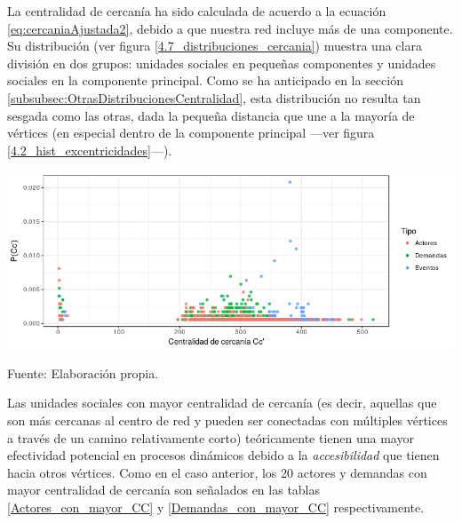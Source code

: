 \documentclass[letterpaper, 11pt]{book}
\theoremstyle{definition}
\theoremstyle{remark}
\begin{document}
La centralidad de cercanía ha sido calculada de acuerdo a la ecuación \ref{eq:cercaniaAjustada2}, debido a que nuestra red incluye más de una componente. 
Su distribución (ver figura \ref{4.7_distribuciones_cercania}) muestra una clara división en dos grupos: unidades sociales en pequeñas componentes y unidades sociales en la componente principal. 
Como se ha anticipado en la sección \ref{subsubsec:OtrasDistribucionesCentralidad}, esta distribución no resulta tan sesgada como las otras, dada la pequeña distancia que une a la mayoría de vértices (en especial dentro de la componente principal ---ver figura \ref{4.2_hist_excentricidades}---). 


\begin{minipage}{\linewidth}
\centering
{} \label{4.7_distribuciones_cercania}
\includegraphics[scale=0.7]{img/4.7_distribuciones_cercania.png}
\par
\small Fuente: Elaboración propia.
\end{minipage}\bigskip


Las unidades sociales con mayor centralidad de cercanía (es decir, aquellas que son más cercanas al centro de red y pueden ser conectadas con múltiples vértices a través de un camino relativamente corto) teóricamente tienen una mayor efectividad potencial en procesos dinámicos debido a la \emph{accesibilidad} que tienen hacia otros vértices. 
Como  en el caso anterior, los 20 actores y demandas con mayor centralidad de cercanía son señalados en las tablas \ref{Actores_con_mayor_CC} y \ref{Demandas_con_mayor_CC} respectivamente. 
\end{document}
